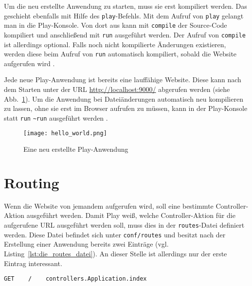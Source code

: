 Um die neu erstellte Anwendung zu starten, muss sie erst kompiliert werden.
Das geschieht ebenfalls mit Hilfe des \lstinline|play|-Befehls.
Mit dem Aufruf von \lstinline|play| gelangt man in die Play-Konsole.
Von dort aus kann mit \lstinline|compile| der Source-Code kompiliert und anschließend mit \lstinline|run| ausgeführt werden.
Der Aufruf von \lstinline|compile| ist allerdings optional.
Falls noch nicht kompilierte Änderungen existieren, werden diese beim Aufruf von \lstinline|run| automatisch kompiliert, sobald die Website aufgerufen wird \cite[vgl.][]{play_compile}.

Jede neue Play-Anwendung ist bereits eine lauffähige Website.
Diese kann nach dem Starten unter der URL \url{http://localhost:9000/} abgerufen werden (siehe Abb.~\ref{fig:anwendung_nach_erstellung}).
Um die Anwendung bei Dateiänderungen automatisch neu kompilieren zu lassen, ohne sie erst im Browser aufrufen zu müssen, kann in der Play-Konsole statt \lstinline|run| \lstinline|~run| ausgeführt werden \cite[vgl.][S.~12]{play_for_scala}.

\begin{figure}
\centering
\texttt{[image: hello\_world.png]}
\caption{Eine neu erstellte Play-Anwendung}
\label{fig:anwendung_nach_erstellung}
\end{figure}



\section{Routing} %
\label{sec:routing}

Wenn die Website von jemandem aufgerufen wird, soll eine bestimmte Controller-Aktion ausgeführt werden.
Damit Play weiß, welche Controller-Aktion für die aufgerufene URL ausgeführt werden soll, muss dies in der \lstinline|routes|-Datei definiert werden.
Diese Datei befindet sich unter \lstinline|conf/routes| und besitzt nach der Erstellung einer Anwendung bereits zwei Einträge (vgl. Listing~\ref{lst:die_routes_datei}).
An dieser Stelle ist allerdings nur der erste Eintrag interessant.

\begin{lstlisting}[caption=Die routes-Datei, label=lst:die_routes_datei]
  GET    /    controllers.Application.index
\end{lstlisting}

